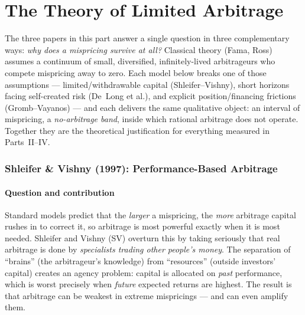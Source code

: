 \part{The Theory of Limited Arbitrage}
\label{part:theory}

The three papers in this part answer a single question in three complementary ways: \emph{why does a mispricing survive at all?} Classical theory (Fama, Ross) assumes a continuum of small, diversified, infinitely-lived arbitrageurs who compete mispricing away to zero. Each model below breaks one of those assumptions --- limited/withdrawable capital (Shleifer--Vishny), short horizons facing self-created risk (De~Long et al.), and explicit position/financing frictions (Gromb--Vayanos) --- and each delivers the same qualitative object: an interval of mispricing, a \emph{no-arbitrage band}, inside which rational arbitrage does not operate. Together they are the theoretical justification for everything measured in Parts~II--IV.

\section{Shleifer \& Vishny (1997): Performance-Based Arbitrage}
\label{sec:sv}

\subsection*{Question and contribution}
Standard models predict that the \emph{larger} a mispricing, the \emph{more} arbitrage capital rushes in to correct it, so arbitrage is most powerful exactly when it is most needed. Shleifer and Vishny (SV) overturn this by taking seriously that real arbitrage is done by \emph{specialists trading other people's money}. The separation of ``brains'' (the arbitrageur's knowledge) from ``resources'' (outside investors' capital) creates an agency problem: capital is allocated on \emph{past} performance, which is worst precisely when \emph{future} expected returns are highest. The result is that arbitrage can be weakest in extreme mispricings --- and can even amplify them.

